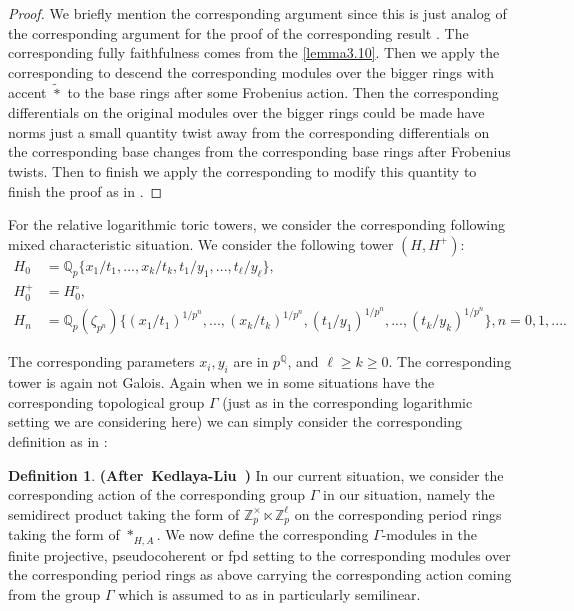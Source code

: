 \documentclass[12pt]{amsart}
\theoremstyle{definition}
\newtheorem{definition}[theorem]{Definition}
\numberwithin{equation}{section}
\begin{document}
\begin{proof}
We briefly mention the corresponding argument since this is just analog of the corresponding argument for the proof of the corresponding result \cite[Lemma 5.6.9]{KL16}. The corresponding fully faithfulness comes from the \cref{lemma3.10}. Then we apply the corresponding \cite[Lemma 5.6.8]{KL16} to descend the corresponding modules over the bigger rings with accent $\widetilde{*}$ to the base rings after some Frobenius action. Then the corresponding differentials on the original modules over the bigger rings could be made have norms just a small quantity twist away from the corresponding differentials on the corresponding base changes from the corresponding base rings after Frobenius twists. Then to finish we apply the corresponding \label{lemma3.10} to modify this quantity to finish the proof as in \cite[Lemma 5.6.9]{KL16}.
\end{proof}



\indent For the relative logarithmic toric towers, we consider the corresponding following mixed characteristic situation. We consider the following tower $(H,H^+)$:
\begin{align}
H_0&=\mathbb{Q}_p\{x_1/t_1,...,x_k/t_k,t_1/y_1,...,t_\ell/y_\ell\},\\
H_0^+&=H_0^\circ,\\
H_n&=\mathbb{Q}_p(\zeta_{p^n})\{(x_1/t_1)^{1/p^n},...,(x_k/t_k)^{1/p^n},(t_1/y_1)^{1/p^n},...,(t_k/y_k)^{1/p^n}\}, n=0,1,....	
\end{align}

The corresponding parameters $x_i,y_i$ are in $p^\mathbb{Q}$, and $\ell\geq k\geq 0$. The corresponding tower is again not Galois. Again when we in some situations have the corresponding topological group $\Gamma$ (just as in the corresponding logarithmic setting we are considering here) we can simply consider the corresponding definition as in \cite[Definition 7.3.5]{KL16}:


\begin{definition} \mbox{\bf{(After Kedlaya-Liu \cite[Definition 7.3.5]{KL16})}}
In our current situation, we consider the corresponding action of the corresponding group $\Gamma$ in our situation, namely the semidirect product taking the form of $\mathbb{Z}^\times_p\ltimes \mathbb{Z}_p^\ell$ on the corresponding period rings taking the form of $*_{H,A}$. We now define the corresponding $\Gamma$-modules in the finite projective, pseudocoherent or fpd setting to the corresponding modules over the corresponding period rings as above carrying the corresponding action coming from the group $\Gamma$ which is assumed to as in \cite[Definition 7.3.5]{KL16} particularly semilinear. 	
\end{definition}
\end{document}
